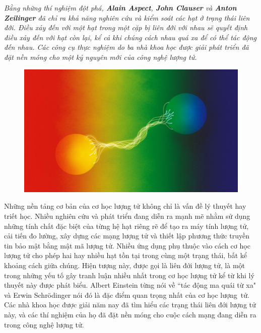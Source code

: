 \begin{multicols}{2}
	\textit{Bằng những thí nghiệm đột phá, \textbf{\color{timhieukhoahoc}Alain Aspect}, \textbf{\color{timhieukhoahoc}John Clauser} và \textbf{\color{timhieukhoahoc}Anton Zeilinger} đã chỉ ra khả năng nghiên cứu và kiểm soát các hạt ở trạng thái liên đới. Điều xảy đến với một hạt trong một cặp bị liên đới với nhau sẽ quyết định điều xảy đến với hạt còn lại, kể cả khi chúng cách nhau quá xa để có thể tác động đến nhau. Các công cụ thực nghiệm do ba nhà khoa học được giải phát triển đã đặt nền móng cho một kỷ nguyên mới của công nghệ lượng tử.}
	\begin{figure}[H]
		\vspace*{-5pt}
		\centering
		\captionsetup{labelformat= empty, justification=centering}
		\includegraphics[width= 1\linewidth]{7}
		\vspace*{-20pt}
	\end{figure}
	Những nền tảng cơ bản của cơ học lượng tử không chỉ là vấn đề lý thuyết hay triết học. Nhiều nghiên cứu và phát triển đang diễn ra mạnh mẽ nhằm sử dụng những tính chất đặc biệt của từng hệ hạt riêng rẽ để tạo ra máy tính lượng tử, cải tiến đo lường, xây dựng các mạng lượng tử và thiết lập phương thức truyền tin bảo mật bằng mật mã lượng tử.
	\vskip 0.1cm
	Nhiều ứng dụng phụ thuộc vào cách cơ học lượng tử cho phép hai hay nhiều hạt tồn tại trong cùng một trạng thái, bất kể khoảng cách giữa chúng. Hiện tượng này, được gọi là liên đới lượng tử, là một trong những yếu tố gây tranh luận nhiều nhất trong cơ học lượng tử kể từ khi lý thuyết này được phát biểu. Albert Einstein từng nói về ``tác động ma quái từ xa" và Erwin Schrödinger nói đó là đặc điểm quan trọng nhất của cơ học lượng~tử.
	\vskip 0.1cm
	Các nhà khoa học được giải năm nay đã tìm hiểu các trạng thái liên đới lượng tử này, và các thí nghiệm của họ đã đặt nền móng cho cuộc cách mạng đang diễn ra trong công nghệ lượng tử.

\end{multicols}
